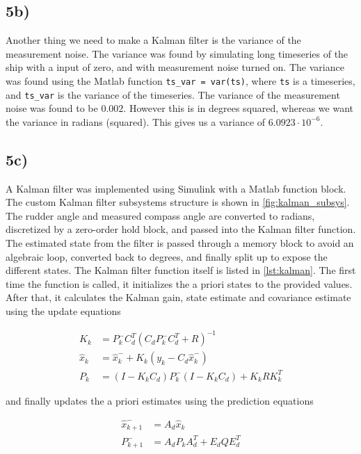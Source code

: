 \subsection{5b)}

Another thing we need to make a Kalman filter is the variance of the measurement noise. The variance was found by simulating long timeseries of the ship with a input of zero, and with measurement noise turned on. The variance was found using the Matlab function \texttt{ts\_var = var(ts)}, where \texttt{ts} is a timeseries, and \texttt{ts\_var} is the variance of the timeseries. The variance of the measurement noise was found to be $0.002$. However this is in degrees squared, whereas we want the variance in radians (squared). This gives us a variance of $6.0923 \cdot 10^{-6}$.

\subsection{5c)}

A Kalman filter was implemented using Simulink with a Matlab function block. The custom Kalman filter subsystems structure is shown in \cref{fig:kalman_subsys}. The rudder angle and measured compass angle are converted to radians, discretized by a zero-order hold block, and passed into the Kalman filter function. The estimated state from the filter is passed through a memory block to avoid an algebraic loop, converted back to degrees, and finally split up to expose the different states.
The Kalman filter function itself is listed in \cref{lst:kalman}. The first time the function is called, it initializes the a priori states to the provided values. After that, it calculates the Kalman gain, state estimate and covariance estimate using the update equations

\begin{subequations}
    \begin{align}
        K_k &= P_k^-C_d^T(C_dP_k^-C_d^T+R)^{-1} \\
        \hat{x}_k &= \hat{x}_k^- + K_k(y_k - C_d\hat{x}_k^-) \\
        P_k &= (I - K_kC_d)P_k^-(I-K_kC_d) + K_kRK_k^T
    \end{align}

\end{subequations}

and finally updates the a priori estimates using the prediction equations

\begin{subequations}
    \begin{align}
        \hat{x}_{k+1}^- &= A_d\hat{x}_k \\
        P_{k+1}^- &= A_d P_k A_d^T + E_d Q E_d^T
    \end{align}

\end{subequations}

